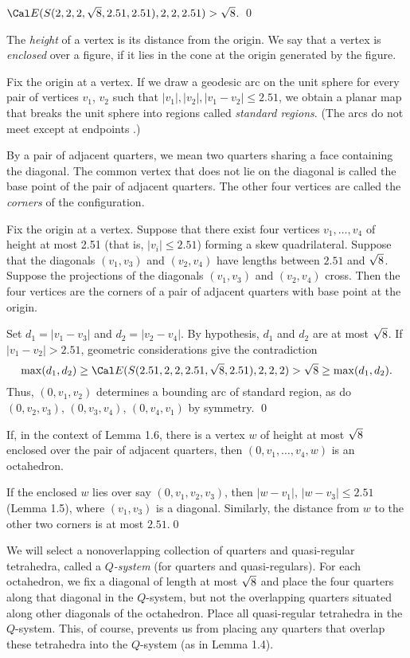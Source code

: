   ${\Cal E}(S(2,2,2,\sqr8,2.51,2.51),2,2,2.51) > \sqr8$.
\qed\enddemo

The {\it height\/} of a vertex is its distance
from the origin.
We say that a vertex is {\it enclosed\/} over a figure,
if it lies in the cone at the origin generated by the figure.

Fix the origin at a vertex.  If we draw a geodesic arc on the
unit sphere for every pair of vertices $v_1$, $v_2$ such that
$|v_1|, |v_2|, |v_1-v_2|\le 2.51$, we obtain a planar map that breaks
the unit sphere into regions called {\it standard regions}.
(The arcs do not meet except at endpoints \cite{I.3.10}.)

By a pair of adjacent quarters, we mean two quarters
sharing a face containing the diagonal. 
The common vertex that
does not lie on the diagonal is called the base point of
the pair of adjacent quarters.  The other four vertices
are called the {\it corners\/} of the configuration.

  Fix the origin at a vertex.
Suppose that there exist four vertices $v_1,\ldots,v_4$ of height
at most 2.51 (that is, $|v_i|\le 2.51$) forming a skew quadrilateral.   
Suppose that the diagonals $(v_1,v_3)$ and $(v_2,v_4)$
have lengths between $2.51$ and $\sqrt8$.
Suppose the projections of the diagonals $(v_1,v_3)$ and $(v_2,v_4)$
cross.
Then the four vertices are the corners of a pair of adjacent
quarters with base point at the origin.
\endproclaim

 Set $d_1=|v_1-v_3|$ and $d_2 = |v_2-v_4|$.
By hypothesis, $d_1$ and $d_2$ are at most $\sqrt8$.
 If $|v_1-v_2|>2.51$,
geometric considerations give the contradiction
$$\max(d_1,d_2)\ge \Cal E(S(2.51,2,2,2.51,\sqr8,2.51),2,2,2) > \sqr8
	\ge\max(d_1,d_2).$$
Thus, $(0,v_1,v_2)$ determines a bounding arc of 
standard region,  as do $(0,v_2,v_3)$, $(0,v_3,v_4)$, $(0,v_4,v_1)$
by symmetry. \qed\enddemo


  If, in the context of Lemma 1.6, there is a 
vertex $w$ of height at most $\sqrt8$ enclosed over the 
pair of adjacent quarters,
then $(0,v_1,\ldots,v_4,w)$ is an octahedron.
\endproclaim

  If the enclosed $w$ lies over 
say $(0,v_1,v_2,v_3)$,
then $|w-v_1|$, $|w-v_3|\le 2.51$ (Lemma 1.5), where $(v_1,v_3)$ is
a diagonal.  Similarly, the distance from $w$ to the other two
corners is at most $2.51$.\qed\enddemo

\bigskip

We will select a nonoverlapping collection
of quarters and quasi-regular tetrahedra,  called
a {\it $Q$-system\/} (for quarters and quasi-regulars).
For each octahedron, we fix a diagonal 
of length at most $\sqrt8$ and
place the four quarters along that diagonal in the $Q$-system, but not
the overlapping quarters situated 
along other diagonals of the octahedron.
Place all quasi-regular tetrahedra in the $Q$-system. This, of course,
prevents us from placing
any quarters that overlap these tetrahedra into the 
$Q$-system (as in Lemma 1.4).

